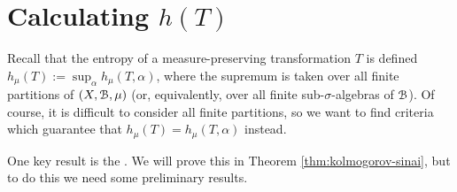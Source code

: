 \section{Calculating \texorpdfstring{$h(T)$}{h(T)}}
Recall that the entropy of a measure-preserving transformation $T$ is defined $h_\mu(T) := \sup_{\alpha}{h_\mu(T, \alpha)}$, where the supremum is taken over all finite partitions of $(X, \mathcal{B}, \mu)$ (or, equivalently, over all finite sub-$\sigma$-algebras of $\mathcal{B}$). Of course, it is difficult to consider all finite partitions, so we want to find criteria which guarantee that $h_\mu(T) = h_\mu(T, \alpha)$ instead.

One key result is the . We will prove this in Theorem \ref{thm:kolmogorov-sinai}, but to do this we need some preliminary results.

